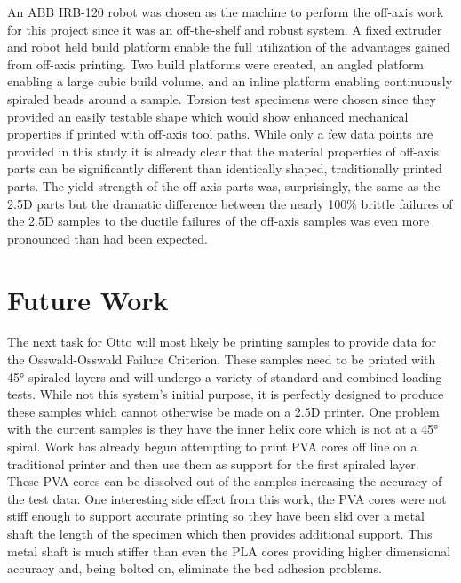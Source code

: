 \documentclass[main.tex]{subfiles}
\begin{document}
An ABB IRB-120 robot was chosen as the machine to perform the off-axis work for this project since it was an off-the-shelf and robust system.
A fixed extruder and robot held build platform enable the full utilization of the advantages gained from off-axis printing.
Two build platforms were created, an angled platform enabling a large cubic build volume, and an inline platform enabling continuously spiraled beads around a sample.
Torsion test specimens were chosen since they provided an easily testable shape which would show enhanced mechanical properties if printed with off-axis tool paths.
While only a few data points are provided in this study it is already clear that the material properties of off-axis parts can be significantly different than identically shaped, traditionally printed parts.
The yield strength of the off-axis parts was, surprisingly, the same as the 2.5D parts but the dramatic difference between the nearly 100\% brittle failures of the 2.5D samples to the ductile failures of the off-axis samples was even more pronounced than had been expected.

\section{Future Work}
The next task for Otto will most likely be printing samples to provide data for the Osswald-Osswald Failure Criterion.
These samples need to be printed with \ang{45} spiraled layers and will undergo a variety of standard and combined loading tests.
While not this system's initial purpose, it is perfectly designed to produce these samples which cannot otherwise be made on a 2.5D printer.
One problem with the current samples is they have the inner helix core which is not at a \ang{45} spiral.
Work has already begun attempting to print PVA cores off line on a traditional printer and then use them as support for the first spiraled layer.
%
These PVA cores can be dissolved out of the samples increasing the accuracy of the test data.
One interesting side effect from this work, the PVA cores were not stiff enough to support accurate printing so they have been slid over a metal shaft the length of the specimen which then provides additional support.
This metal shaft is much stiffer than even the PLA cores providing higher dimensional accuracy and, being bolted on, eliminate the bed adhesion problems.
\end{document}
